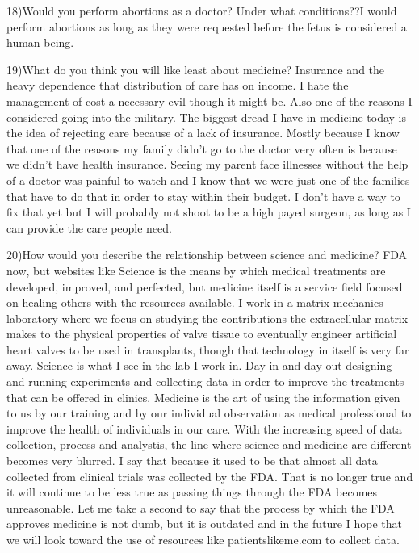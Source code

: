 \documentclass[12pt,a4paper,article]{memoir} %
\begin{document}
18)Would you perform abortions as a doctor? Under what conditions??I would perform abortions as long as they were requested before the fetus is considered a human being.  

19)What do you think you will like least about medicine?
Insurance and the heavy dependence that distribution of care has on income.  
I hate the management of cost a necessary evil though it might be. Also one of the reasons I considered going into the military.  The biggest dread I have in medicine today is the idea of rejecting care because of a lack of insurance.  Mostly because I know that one of the reasons my family didn't go to the doctor very often is because we didn't have health insurance.  Seeing my parent face illnesses without the help of a doctor was painful to watch and I know that we were just one of the families that have to do that in order to stay within their budget.  I don't have a way to fix that yet but I will probably not shoot to be a high payed surgeon, as long as I can provide the care people need.  

20)How would you describe the relationship between science and medicine?
FDA now, but websites like 
Science is the means by which medical treatments are developed, improved, and perfected, but medicine itself is a service field focused on healing others with the resources available. I work in a matrix mechanics laboratory where we focus on studying the contributions the extracellular matrix makes to the physical properties of valve tissue to eventually engineer artificial heart valves to be used in transplants, though that technology in itself is very far away.  Science is what I see in the lab I work in.  Day in and day out designing and running experiments and collecting data in order to improve the treatments that can be offered in clinics.  Medicine is the art of using the information given to us by our training and by our individual observation as medical professional to improve the health of individuals in our care.  With the increasing speed of data collection, process and analystis, the line where science and medicine are different becomes very blurred.  I say that because it used to be that almost all data collected from clinical trials was collected by the FDA.  That is no longer true and it will continue to be less true as passing things through the FDA becomes unreasonable. Let me take a second to say that the process by which the FDA approves medicine is not dumb, but it is outdated and in the future I hope that we will look toward the use of resources like patientslikeme.com to collect data.  
\end{document}
